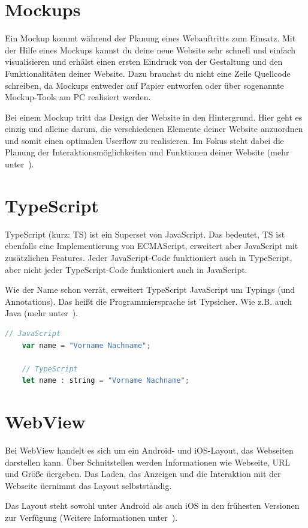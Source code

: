 \section{Mockups}
Ein Mockup kommt während der Planung eines Webauftritts zum Einsatz. Mit der Hilfe eines Mockups kannst du deine neue
Website sehr schnell und einfach visualisieren und erhälst einen ersten Eindruck von der Gestaltung und den
Funktionalitäten deiner Website. Dazu brauchst du nicht eine Zeile Quellcode schreiben, da Mockups entweder auf Papier
entworfen oder über sogenannte Mockup-Tools am PC realisiert werden.

Bei einem Mockup tritt das Design der Website in den Hintergrund. Hier geht es einzig und alleine darum, die
verschiedenen Elemente deiner Website anzuordnen und somit einen optimalen Userflow zu realisieren. Im Fokus steht
dabei die Planung der Interaktionsmöglichkeiten und Funktionen deiner Website (mehr unter~\cite{book_grundlagen_mockups}).

\section{TypeScript}
TypeScript (kurz: TS) ist ein Superset von JavaScript. Das bedeutet, TS ist ebenfalls eine Implementierung von ECMAScript,
erweitert aber JavaScript mit zusätzlichen Features. Jeder JavaScript-Code funktioniert auch in TypeScript, aber nicht
jeder TypeScript-Code funktioniert auch in JavaScript.

Wie der Name schon verrät, erweitert TypeScript JavaScript um Typings (und Annotations). Das heißt die Programmiersprache
ist Typsicher. Wie z.B. auch Java (mehr unter~\cite{book_grundlagen_typescript}).

\begin{lstlisting}[language=JavaScript, caption=Unterschied zwischen JavaScript und TypeScript, label=Unterschied zwischen JavaScript und TypeScript]
    // JavaScript
    var name = "Vorname Nachname";

    // TypeScript
    let name : string = "Vorname Nachname";
\end{lstlisting}

\section{WebView}
Bei WebView handelt es sich um ein Android- und iOS-Layout, das Webseiten darstellen kann. Über Schnitstellen werden
Informationen wie Webseite, URL und Größe üergeben. Das Laden, das Anzeigen und die Interaktion mit der Webseite üernimmt
das Layout selbstständig.

Das Layout steht sowohl unter Android als auch iOS in den frühesten Versionen zur Verfügung (Weitere Informationen
unter~\cite{online_grundlagen_webview}).